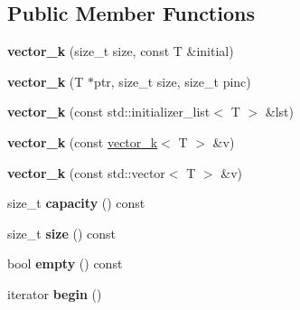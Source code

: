 \subsection*{Public Member Functions}
\begin{DoxyCompactItemize}
\item 
\hypertarget{classkeycpp_1_1vector__k_a1f65dfce13d605312c497195081b71fa}{{\bfseries vector\-\_\-k} (size\-\_\-t size, const T \&initial)}\label{classkeycpp_1_1vector__k_a1f65dfce13d605312c497195081b71fa}

\item 
\hypertarget{classkeycpp_1_1vector__k_a6902434fbd3b5ebbbedc1b068c3df3ec}{{\bfseries vector\-\_\-k} (T $\ast$ptr, size\-\_\-t size, size\-\_\-t pinc)}\label{classkeycpp_1_1vector__k_a6902434fbd3b5ebbbedc1b068c3df3ec}

\item 
\hypertarget{classkeycpp_1_1vector__k_a5b6df14409684df91f883c3bb33204f5}{{\bfseries vector\-\_\-k} (const std\-::initializer\-\_\-list$<$ T $>$ \&lst)}\label{classkeycpp_1_1vector__k_a5b6df14409684df91f883c3bb33204f5}

\item 
\hypertarget{classkeycpp_1_1vector__k_a694c6c797022382b57e2d51350e39afc}{{\bfseries vector\-\_\-k} (const \hyperlink{classkeycpp_1_1vector__k}{vector\-\_\-k}$<$ T $>$ \&v)}\label{classkeycpp_1_1vector__k_a694c6c797022382b57e2d51350e39afc}

\item 
\hypertarget{classkeycpp_1_1vector__k_a5e130370253f66d9968c35d41228bef4}{{\bfseries vector\-\_\-k} (const std\-::vector$<$ T $>$ \&v)}\label{classkeycpp_1_1vector__k_a5e130370253f66d9968c35d41228bef4}

\item 
\hypertarget{classkeycpp_1_1vector__k_a651efbae7ea28e3e4cc3a07375a8de72}{size\-\_\-t {\bfseries capacity} () const }\label{classkeycpp_1_1vector__k_a651efbae7ea28e3e4cc3a07375a8de72}

\item 
\hypertarget{classkeycpp_1_1vector__k_a829c7caf8f696e161375d18b715c918a}{size\-\_\-t {\bfseries size} () const }\label{classkeycpp_1_1vector__k_a829c7caf8f696e161375d18b715c918a}

\item 
\hypertarget{classkeycpp_1_1vector__k_abbba6e3a7e0dc425a78645f78417c62c}{bool {\bfseries empty} () const }\label{classkeycpp_1_1vector__k_abbba6e3a7e0dc425a78645f78417c62c}

\item 
\hypertarget{classkeycpp_1_1vector__k_a57ec9796301fc1db249c531cbcb02b86}{iterator {\bfseries begin} ()}\label{classkeycpp_1_1vector__k_a57ec9796301fc1db249c531cbcb02b86}


\end{DoxyCompactItemize}
